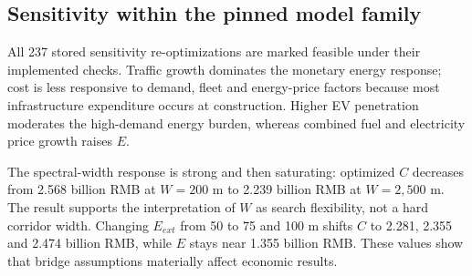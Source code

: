 \documentclass[preprint,12pt]{elsarticle}
\begin{document}
\begin{table}[t]
\centering
\caption{Objective mean (SD) over ten runs. Equal generations do not imply equal NFE.}
\label{tab:benchmark}
\scriptsize
{}
\end{table}

\subsection{Sensitivity within the pinned model family}

All 237 stored sensitivity re-optimizations are marked feasible under their implemented checks. Traffic growth dominates the monetary energy response; cost is less responsive to demand, fleet and energy-price factors because most infrastructure expenditure occurs at construction. Higher EV penetration moderates the high-demand energy burden, whereas combined fuel and electricity price growth raises $E$.

The spectral-width response is strong and then saturating: optimized $C$ decreases from 2.568 billion RMB at $W=200$ m to 2.239 billion RMB at $W=2{,}500$ m. The result supports the interpretation of $W$ as search flexibility, not a hard corridor width. Changing $E_{ext}$ from 50 to 75 and 100 m shifts $C$ to 2.281, 2.355 and 2.474 billion RMB, while $E$ stays near 1.355 billion RMB. These values show that bridge assumptions materially affect economic results.
\end{document}
